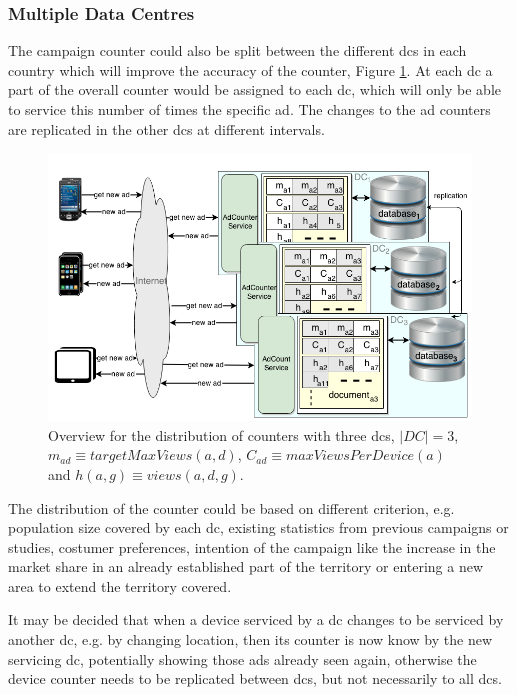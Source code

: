 \subsubsection{Multiple Data Centres}
The campaign counter could also be split between the different \glspl{dc} in each country which will improve the accuracy of the counter, Figure \ref{fig:ads_countert_}. At each \gls{dc} a part of the overall counter would be assigned to each \gls{dc}, which will only be able to service this number of times the specific ad. The changes to the ad counters are replicated in the other \glspl{dc} at different intervals.
\begin{figure}[ht!]
	\centering
	\includegraphics[width=1\linewidth]{figures/AdsServiceSpread2DCs.png}

	\caption{Overview for the distribution of counters with three \glspl{dc}, $|DC| = 3$, $m_{ad} \equiv targetMaxViews(a, d)$, $C_{ad} \equiv maxViewsPerDevice(a)$ and $h(a, g) \equiv views(a, d, g)$.}
	\label{fig:ads_countert_}
\end{figure}

The distribution of the counter could be based on different criterion, e.g. population size covered by each \gls{dc}, existing statistics from previous campaigns or studies, costumer preferences, intention of the campaign like the increase in the market share in an already established part of the territory or entering a new area to extend the territory covered.

It may be decided that when a device serviced by a \gls{dc} changes to be serviced by another \gls{dc}, e.g. by changing location, then its counter is now know by the new servicing \gls{dc}, potentially showing those ads already seen again, otherwise the device counter needs to be replicated between \glspl{dc}, but not necessarily to all \glspl{dc}.

